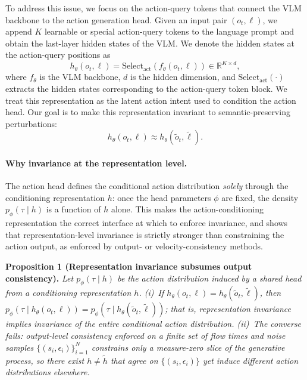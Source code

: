 \documentclass[letterpaper]{article} %
\begin{document}
To address this issue, we focus on the action-query tokens that connect the VLM backbone to the action generation head. Given an input pair $(o_t,\ell)$, we append $K$ learnable or special action-query tokens to the language prompt and obtain the last-layer hidden states of the VLM. We denote the hidden states at the action-query positions as
\begin{equation}
    h_\theta(o_t,\ell)
    =
    \mathrm{Select}_{\mathrm{act}}
    \left(
    f_\theta(o_t,\ell)
    \right)
    \in \mathbb{R}^{K \times d},
\end{equation}
where $f_\theta$ is the VLM backbone, $d$ is the hidden dimension, and $\mathrm{Select}_{\mathrm{act}}(\cdot)$ extracts the hidden states corresponding to the action-query token block. We treat this representation as the latent action intent used to condition the action head. Our goal is to make this representation invariant to semantic-preserving perturbations:
\begin{equation}
    h_\theta(o_t,\ell)
    \approx
    h_\theta(\tilde{o}_t,\tilde{\ell}).
\end{equation}

\paragraph{Why invariance at the representation level.}
The action head defines the conditional action distribution \emph{solely} through the conditioning representation $h$: once the head parameters $\phi$ are fixed, the density $p_\phi(\tau \mid h)$ is a function of $h$ alone. This makes the action-conditioning representation the correct interface at which to enforce invariance, and shows that representation-level invariance is strictly stronger than constraining the action output, as enforced by output- or velocity-consistency methods.

\noindent\textbf{Proposition 1 (Representation invariance subsumes output consistency).}
\textit{Let $p_\phi(\tau\mid h)$ be the action distribution induced by a shared head from a conditioning representation $h$.
(i)~If $h_\theta(o_t,\ell)=h_\theta(\tilde{o}_t,\tilde{\ell})$, then
$p_\phi\!\left(\tau\mid h_\theta(o_t,\ell)\right)=p_\phi\!\left(\tau\mid h_\theta(\tilde{o}_t,\tilde{\ell})\right)$;
that is, representation invariance implies invariance of the \emph{entire} conditional action distribution.
(ii)~The converse fails: output-level consistency enforced on a finite set of flow times and noise samples $\{(s_i,\epsilon_i)\}_{i=1}^{N}$ constrains only a measure-zero slice of the generative process, so there exist $h\neq\tilde{h}$ that agree on $\{(s_i,\epsilon_i)\}$ yet induce different action distributions elsewhere.}
\end{document}

